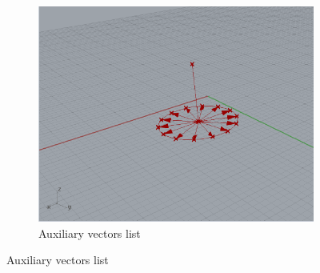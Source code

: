 \documentclass[preprint,12pt,3p]{elsarticle}
\begin{document}
\begin{figure}
\begin{subfigure}{0.3\textwidth}
  \includegraphics[width=.9\linewidth]{a02s06.png}
  \caption{Auxiliary vectors list}
  \label{fig:a02s06}
\end{subfigure}



\end{figure}
\end{document}
